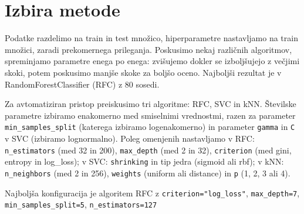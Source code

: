 \documentclass{article}
\begin{document}
\section{Izbira metode}
Podatke razdelimo na train in test množico, hiperparametre nastavljamo na train množici, zaradi prekomernega prileganja. Poskusimo nekaj različnih algoritmov, spreminjamo parametre enega po enega: zvišujemo dokler se izboljšujejo z večjimi skoki, potem poskusimo manjše skoke za boljšo oceno. Najboljši rezultat je v RandomForestClassifier (RFC) z 80 sosedi.

Za avtomatiziran pristop preiskusimo tri algoritme: RFC, SVC in kNN. Številske parametre izbiramo enakomerno med smiselnimi vrednostmi, razen za parameter \verb|min_samples_split| (katerega izbiramo logenakomerno) in parameter \verb|gamma| in \verb|C| v SVC (izbiramo lognormalno). Poleg omenjenih nastavljamo v RFC: \verb|n_estimators| (med 32 in 200), \verb|max_depth| (med 2 in 32), \verb|criterion| (med gini, entropy in log\_loss); v SVC: \verb|shrinking| in tip jedra (sigmoid ali rbf); v kNN: \verb|n_neighbors| (med 2 in 256), \verb|weights| (uniform ali distance) in \verb|p| (1, 2, 3 ali 4).

Najboljša konfiguracija je algoritem RFC z \verb|criterion="log_loss"|, \verb|max_depth=7|, \verb|min_samples_split=5|, \verb|n_estimators=127|
\end{document}
